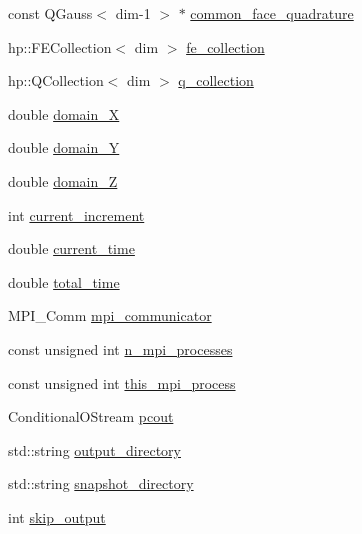 \begin{DoxyCompactItemize}
\item 
const Q\+Gauss$<$ dim-\/1 $>$ $\ast$ \mbox{\hyperlink{classmechano_chem_f_e_m_af302403bba9078de92d05b4cbe6f44dd}{common\+\_\+face\+\_\+quadrature}}
\item 
hp\+::\+F\+E\+Collection$<$ dim $>$ \mbox{\hyperlink{classmechano_chem_f_e_m_a02ae472de2833f8763bfe10520be87db}{fe\+\_\+collection}}
\item 
hp\+::\+Q\+Collection$<$ dim $>$ \mbox{\hyperlink{classmechano_chem_f_e_m_a748ffdb78a6294cd525fe5979bb30649}{q\+\_\+collection}}
\item 
double \mbox{\hyperlink{classmechano_chem_f_e_m_a9db8ce20b0de349987441b8d6830c97a}{domain\+\_\+X}}
\item 
double \mbox{\hyperlink{classmechano_chem_f_e_m_ae7a91557a809cfab5c3dee32ae1de8cb}{domain\+\_\+Y}}
\item 
double \mbox{\hyperlink{classmechano_chem_f_e_m_a199da42cf8a8e51eaeb5cacfdef1c37e}{domain\+\_\+Z}}
\item 
int \mbox{\hyperlink{classmechano_chem_f_e_m_a9a75da991ed1d29646660b1d16a0418f}{current\+\_\+increment}}
\item 
double \mbox{\hyperlink{classmechano_chem_f_e_m_a557717b333342f1e34a905d6162ce493}{current\+\_\+time}}
\item 
double \mbox{\hyperlink{classmechano_chem_f_e_m_abc276e47b85df9dd59f248e663b3b971}{total\+\_\+time}}
\item 
M\+P\+I\+\_\+\+Comm \mbox{\hyperlink{classmechano_chem_f_e_m_a03728ed636ca889ae407c84d181bc611}{mpi\+\_\+communicator}}
\item 
const unsigned int \mbox{\hyperlink{classmechano_chem_f_e_m_a7320777b83fedaf7a54cdb2fb0ef02e4}{n\+\_\+mpi\+\_\+processes}}
\item 
const unsigned int \mbox{\hyperlink{classmechano_chem_f_e_m_a6c34addfd3b89faf0a7b4e3fe1236fb0}{this\+\_\+mpi\+\_\+process}}
\item 
Conditional\+O\+Stream \mbox{\hyperlink{classmechano_chem_f_e_m_a914f651bc9ca2e223b243695dd37ba53}{pcout}}
\item 
std\+::string \mbox{\hyperlink{classmechano_chem_f_e_m_a95f0e6f488a1faae487cab4198842ebe}{output\+\_\+directory}}
\item 
std\+::string \mbox{\hyperlink{classmechano_chem_f_e_m_af7ed49a5ea9a6407acb26c5a729d4bd0}{snapshot\+\_\+directory}}
\item 
int \mbox{\hyperlink{classmechano_chem_f_e_m_a5413329bd1d73152f051cc8d11134f60}{skip\+\_\+output}}
\item 

\end{DoxyCompactItemize}
